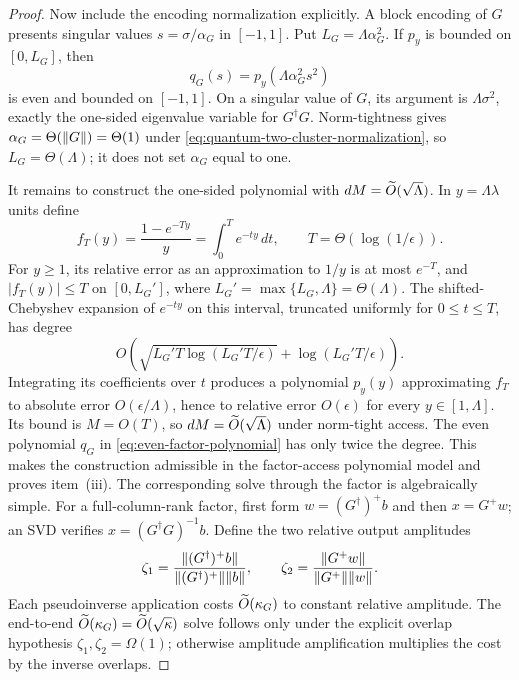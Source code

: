 \begin{proof}
Now include the encoding normalization explicitly.  A block encoding of
$G$ presents singular values $s=\sigma/\alpha_G$ in $[-1,1]$.  Put
$L_G=\Lambda\alpha_G^2$.  If $p_y$ is bounded on $[0,L_G]$, then
\begin{equation}
 q_G(s)=p_y(\Lambda\alpha_G^2s^2)
 \label{eq:even-factor-polynomial}
\end{equation}
is even and bounded on $[-1,1]$.  On a singular value of $G$, its argument
is $\Lambda\sigma^2$, exactly the one-sided eigenvalue variable for
$G^\dagger G$.  Norm-tightness gives $\alpha_G=\Theta(\lVert G\rVert)=\Theta(1)$
under \eqref{eq:quantum-two-cluster-normalization}, so
$L_G=\Theta(\Lambda)$; it does not set $\alpha_G$ equal to one.

It remains to construct the one-sided polynomial with
$dM=\widetilde{O}(\sqrt\Lambda)$.  In $y=\Lambda\lambda$ units define
\[
 f_T(y)=\frac{1-e^{-Ty}}y=\int_0^T e^{-ty}\,dt,
 \qquad T=\Theta(\log(1/\epsilon)).
\]
For $y\geq1$, its relative error as an approximation to $1/y$ is at most
$e^{-T}$, and $|f_T(y)|\leq T$ on $[0,L_G']$, where
$L_G'=\max\{L_G,\Lambda\}=\Theta(\Lambda)$.  The shifted-Chebyshev expansion
of $e^{-ty}$ on this interval, truncated uniformly for
$0\leq t\leq T$, has degree
\[
 O\!\left(\sqrt{L_G'T\log(L_G'T/\epsilon)}
       +\log(L_G'T/\epsilon)\right).
\]
Integrating its coefficients over $t$ produces a polynomial $p_y(y)$ approximating
$f_T$ to absolute error $O(\epsilon/\Lambda)$, hence to relative error
$O(\epsilon)$ for every $y\in[1,\Lambda]$.  Its bound is
$M=O(T)$, so $dM=\widetilde{O}(\sqrt\Lambda)$ under norm-tight access.  The even polynomial
$q_G$ in \eqref{eq:even-factor-polynomial} has only twice the degree.  This
makes the construction admissible in the factor-access
polynomial model and proves item~\textup{(iii)}.  The corresponding solve
through the factor is algebraically simple.  For a full-column-rank factor,
first form
$w=(G^\dagger)^+b$ and then $x=G^+w$; an SVD verifies
$x=(G^\dagger G)^{-1}b$.  Define the two relative output amplitudes
\[
 \zeta_1=
 \frac{\lVert(G^\dagger)^+b\rVert}{\lVert(G^\dagger)^+\rVert\lVert b\rVert},
 \qquad
 \zeta_2=
 \frac{\lVert G^+w\rVert}{\lVert G^+\rVert\lVert w\rVert}.
\]
Each pseudoinverse application costs $\widetilde{O}(\kappa_G)$ to constant
relative amplitude.  The end-to-end
$\widetilde{O}(\kappa_G)=\widetilde{O}(\sqrt\kappa)$ solve follows only under the
explicit overlap hypothesis $\zeta_1,\zeta_2=\Omega(1)$; otherwise amplitude
amplification multiplies the cost by the inverse overlaps.


\end{proof}
